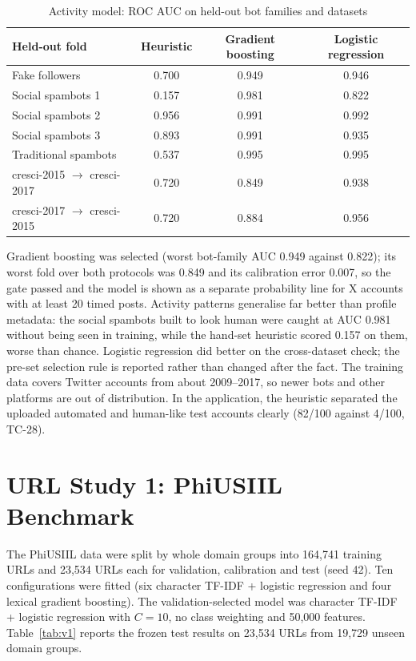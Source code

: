 \begin{table}[H]
\centering
\small
\renewcommand{\arraystretch}{1.12}
\caption{Activity model: ROC AUC on held-out bot families and datasets}
\label{tab:bot2}
\begin{tabular}{|l|c|c|c|}
\hline
\textbf{Held-out fold} & \textbf{Heuristic} & \textbf{Gradient boosting} & \textbf{Logistic regression} \\ \hline
Fake followers & 0.700 & 0.949 & 0.946 \\ \hline
Social spambots 1 & 0.157 & 0.981 & 0.822 \\ \hline
Social spambots 2 & 0.956 & 0.991 & 0.992 \\ \hline
Social spambots 3 & 0.893 & 0.991 & 0.935 \\ \hline
Traditional spambots & 0.537 & 0.995 & 0.995 \\ \hline
cresci-2015 $\rightarrow$ cresci-2017 & 0.720 & 0.849 & 0.938 \\ \hline
cresci-2017 $\rightarrow$ cresci-2015 & 0.720 & 0.884 & 0.956 \\ \hline
\end{tabular}
\end{table}

\noindent Gradient boosting was selected (worst bot-family AUC 0.949 against 0.822); its worst fold over both protocols was 0.849 and its calibration error 0.007, so the gate passed and the model is shown as a separate probability line for X accounts with at least 20 timed posts. Activity patterns generalise far better than profile metadata: the social spambots built to look human were caught at AUC 0.981 without being seen in training, while the hand-set heuristic scored 0.157 on them, worse than chance. Logistic regression did better on the cross-dataset check; the pre-set selection rule is reported rather than changed after the fact. The training data covers Twitter accounts from about 2009--2017, so newer bots and other platforms are out of distribution. In the application, the heuristic separated the uploaded automated and human-like test accounts clearly (82/100 against 4/100, TC-28).

\section{URL Study 1: PhiUSIIL Benchmark}\label{sec:v1res}
\noindent The PhiUSIIL data were split by whole domain groups into 164,741 training URLs and 23,534 URLs each for validation, calibration and test (seed 42). Ten configurations were fitted (six character TF-IDF + logistic regression and four lexical gradient boosting). The validation-selected model was character TF-IDF + logistic regression with $C=10$, no class weighting and 50,000 features. Table~\ref{tab:v1} reports the frozen test results on 23,534 URLs from 19,729 unseen domain groups.

